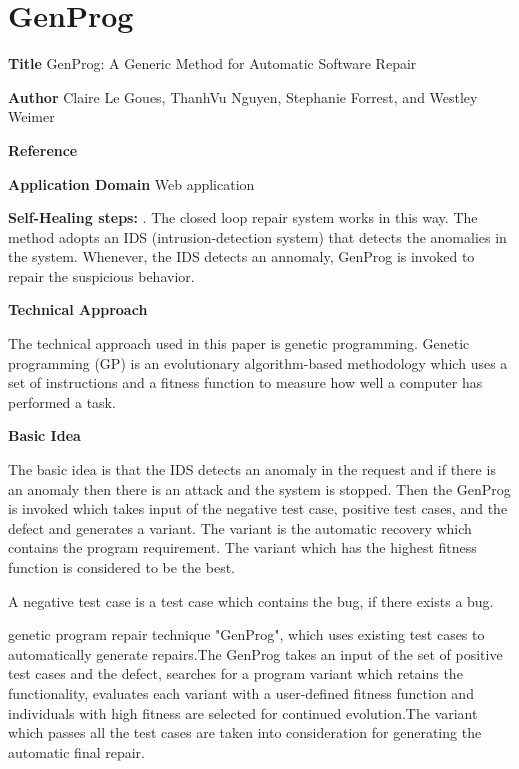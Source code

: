 \section{GenProg}\label{ap:GenProg}
\begin{compactitem}
\item[\textbf{Title}]GenProg: A Generic Method for Automatic Software Repair

\item[\textbf{Author}]
Claire Le Goues, ThanhVu Nguyen, Stephanie Forrest, and Westley Weimer

\item[\textbf{Reference}]  

\cite{le_goues_genprog:_2012}

\item[\textbf{Application Domain}]
Web application 

\item[\textbf{Self-Healing steps:}]. The closed loop repair system works in this way. The method adopts an IDS (intrusion-detection system) that detects the anomalies in the system. Whenever, the IDS detects an annomaly, GenProg is invoked to repair the suspicious behavior.

\item [\textbf{Technical Approach}] 

The technical approach used in this paper is genetic programming. Genetic programming (GP) is an evolutionary algorithm-based methodology which uses a set of instructions and a fitness function to measure how well a computer has performed a task.

\item[\textbf{Basic Idea}]

The basic idea is that the IDS detects an anomaly in the request and if there is an anomaly then there is an attack  and the system is stopped. Then the GenProg is invoked which takes input of the negative test case, positive test cases, and the defect and generates a variant. The variant is the automatic recovery which contains the program requirement. The variant which has the highest fitness function is considered to be the best.

A negative test case is a test case which contains the bug, if there exists a bug.

genetic program repair technique "GenProg", which uses existing test cases to automatically generate repairs.The GenProg takes an input of the set of positive test cases and the defect, searches for a program variant which retains the functionality, evaluates each variant with a user-defined fitness function and individuals with high fitness are selected for continued evolution.The variant which passes all the test cases are taken into consideration for generating the automatic final repair.


\end{compactitem}
